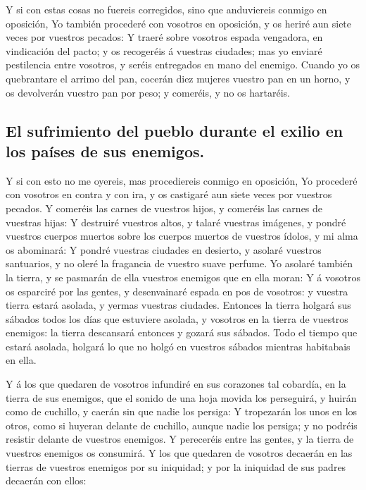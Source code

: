  Y si con estas cosas no fuereis corregidos, sino que
anduviereis conmigo en oposición,  Yo también procederé con
vosotros en oposición, y os heriré aun siete veces por vuestros pecados:
 Y traeré sobre vosotros espada vengadora, en vindicación
del pacto; y os recogeréis á vuestras ciudades; mas yo enviaré
pestilencia entre vosotros, y seréis entregados en mano del enemigo.
 Cuando yo os quebrantare el arrimo del pan, cocerán diez
mujeres vuestro pan en un horno, y os devolverán vuestro pan por peso; y
comeréis, y no os hartaréis.

\hypertarget{el-sufrimiento-del-pueblo-durante-el-exilio-en-los-pauxedses-de-sus-enemigos.}{%
\subsection{El sufrimiento del pueblo durante el exilio en los países de
sus
enemigos.}\label{el-sufrimiento-del-pueblo-durante-el-exilio-en-los-pauxedses-de-sus-enemigos.}}

 Y si con esto no me oyereis, mas procediereis conmigo en
oposición,  Yo procederé con vosotros en contra y con ira,
y os castigaré aun siete veces por vuestros pecados.  Y
comeréis las carnes de vuestros hijos, y comeréis las carnes de vuestras
hijas:  Y destruiré vuestros altos, y talaré vuestras
imágenes, y pondré vuestros cuerpos muertos sobre los cuerpos muertos de
vuestros ídolos, y mi alma os abominará:  Y pondré vuestras
ciudades en desierto, y asolaré vuestros santuarios, y no oleré la
fragancia de vuestro suave perfume.  Yo asolaré también la
tierra, y se pasmarán de ella vuestros enemigos que en ella moran:
 Y á vosotros os esparciré por las gentes, y desenvainaré
espada en pos de vosotros: y vuestra tierra estará asolada, y yermas
vuestras ciudades.  Entonces la tierra holgará sus sábados
todos los días que estuviere asolada, y vosotros en la tierra de
vuestros enemigos: la tierra descansará entonces y gozará sus sábados.
 Todo el tiempo que estará asolada, holgará lo que no holgó
en vuestros sábados mientras habitabais en ella.

 Y á los que quedaren de vosotros infundiré en sus
corazones tal cobardía, en la tierra de sus enemigos, que el sonido de
una hoja movida los perseguirá, y huirán como de cuchillo, y caerán sin
que nadie los persiga:  Y tropezarán los unos en los otros,
como si huyeran delante de cuchillo, aunque nadie los persiga; y no
podréis resistir delante de vuestros enemigos.  Y
pereceréis entre las gentes, y la tierra de vuestros enemigos os
consumirá.  Y los que quedaren de vosotros decaerán en las
tierras de vuestros enemigos por su iniquidad; y por la iniquidad de sus
padres decaerán con ellos:

